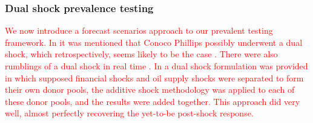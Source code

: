 \documentclass[11pt]{article}
\def\mbf#1{\mathbf{#1}} %
\theoremstyle{definition}
\begin{document}


\subsubsection{Dual shock prevalence testing}


\textcolor{red}{We now introduce a forecast scenarios \citep{baumeister2014real} approach to our prevalent testing framework. In \cite{lin2021minimizing} it was mentioned that Conoco Phillips possibly underwent a dual shock, which retrospectively, seems likely to be the case \citep{sharif2020covid}. There were also rumblings of a dual shock in real time \citep{fitch2020oil, stevens2020oil, westbrook2020forex}.  In \cite{lin2021minimizing} a dual shock formulation was provided in which supposed financial shocks and oil supply shocks were separated to form their own donor pools, the additive shock methodology was applied to each of these donor pools, and the results were added together. This approach did very well, almost perfectly recovering the yet-to-be post-shock response.} 
\end{document}
